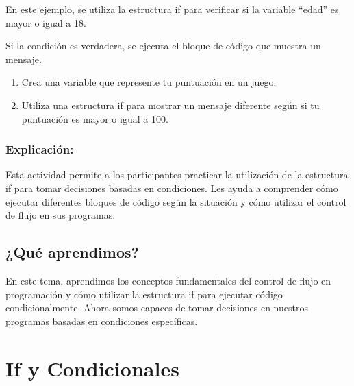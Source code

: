 \documentclass[
  a4paper,
  DIV=11,
  numbers=noendperiod,
  onepage,
  openany]{scrreprt}
\providecommand{\tightlist}{%
  \setlength{\itemsep}{0pt}\setlength{\parskip}{0pt}}\usepackage{longtable,booktabs,array}
\begin{document}
En este ejemplo, se utiliza la estructura if para verificar si la
variable ``edad'' es mayor o igual a 18.

Si la condición es verdadera, se ejecuta el bloque de código que muestra
un mensaje.

\begin{tcolorbox}[enhanced jigsaw, arc=.35mm, left=2mm, colback=white, opacityback=0, opacitybacktitle=0.6, toptitle=1mm, colframe=quarto-callout-tip-color-frame, colbacktitle=quarto-callout-tip-color!10!white, breakable, bottomrule=.15mm, rightrule=.15mm, bottomtitle=1mm, titlerule=0mm, toprule=.15mm, title=\textcolor{quarto-callout-tip-color}{\faLightbulb}\hspace{0.5em}{Actividad Práctica}, coltitle=black, leftrule=.75mm]

\begin{enumerate}
\def\labelenumi{\arabic{enumi}.}
\tightlist
\item
  Crea una variable que represente tu puntuación en un juego.
\item
  Utiliza una estructura if para mostrar un mensaje diferente según si
  tu puntuación es mayor o igual a 100.
\end{enumerate}

\end{tcolorbox}

\subsection{Explicación:}\label{explicaciuxf3n-17}

Esta actividad permite a los participantes practicar la utilización de
la estructura if para tomar decisiones basadas en condiciones. Les ayuda
a comprender cómo ejecutar diferentes bloques de código según la
situación y cómo utilizar el control de flujo en sus programas.

\section{¿Qué aprendimos?}\label{quuxe9-aprendimos-3}

En este tema, aprendimos los conceptos fundamentales del control de
flujo en programación y cómo utilizar la estructura if para ejecutar
código condicionalmente. Ahora somos capaces de tomar decisiones en
nuestros programas basadas en condiciones específicas.

\chapter{If y Condicionales}\label{if-y-condicionales}
\end{document}
